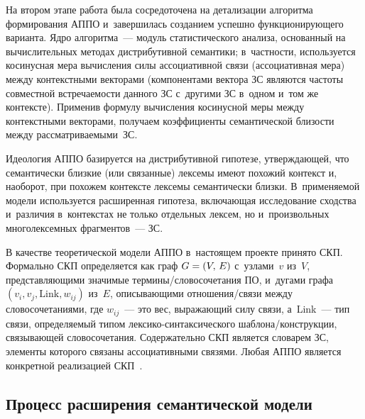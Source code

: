 \begin{multicols}{2}
     На втором этапе работа была сосредоточена на детализации алгоритма
формирования АППО и~завершилась созданием успешно
функционирующего варианта. Ядро алгоритма~--- модуль статистического
анализа, основанный на вычислительных методах дистрибутивной
семантики; в~частности, используется косинусная мера вычисления силы
ассоциативной связи (ассоциативная мера) между контекстными векторами
(компонентами вектора ЗС являются частоты совместной встре\-ча\-емости
данного ЗС с~другими ЗС в~одном и~том же контексте). Применив формулу
вычисления косинусной меры между контекстными векторами, получаем
коэффициенты семантической близости между рассматриваемыми~ЗС.

     Идеология АППО базируется на дистрибутивной гипотезе,
утверждающей, что семантически близкие (или связанные) лексемы имеют
похожий контекст и, наоборот, при похожем контексте лексемы
семантически близки. В~применяемой модели используется расширенная
гипотеза, включающая исследование сходства и~различия в~контекстах не
только отдельных лексем, но и~произвольных многолексемных
     фрагментов~--- ЗС.

     В качестве теоретической модели АППО в~настоящем проекте принято
СКП. Формально СКП
определяется как граф $G\hm=(V,\,E)$ с~узлами~$v$ из~$V$,
представляющими значимые термины/словосочетания ПО, и~дугами графа
$(v_i, v_j, \mathrm{Link}, w_{ij})$ из~$E$, описывающими отношения/связи между
словосочетаниями, где $w_{ij}$~--- это вес, выражающий силу связи,
а~Link~--- тип связи, определяемый типом
     лек\-си\-ко-син\-так\-си\-че\-ско\-го шаблона/конструкции,
связывающей словосочетания. Содержательно СКП является словарем
ЗС, элементы которого связаны ассоциативными
связями. Любая АППО является конкретной реализацией СКП~\cite{1-koz}.

\vspace*{-6pt}

     \subsection{Процесс расширения семантической модели}

     \vspace*{-2pt}


\end{multicols}
